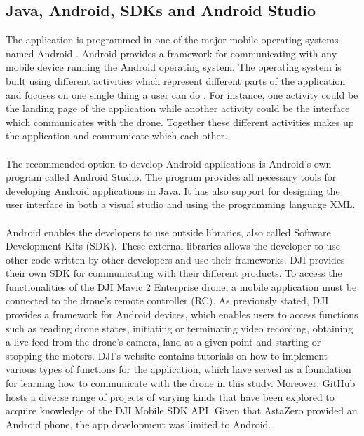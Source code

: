 \subsection{Java, Android, SDKs and Android Studio} \label{Java, Android....}
The application is programmed in one of the major mobile operating systems named Android . Android provides a framework for communicating with any mobile device running the Android operating system. The operating system is built using different activities which represent different parts of the application  and focuses on one single thing a user can do \cite{Android}. For instance, one activity could be the landing page of the application while another activity could be the interface which communicates with the drone. Together these different activities makes up the application and communicate which each other.
\\ \\
The recommended option to develop Android applications is Android's own program called Android Studio. The program provides all necessary tools for developing Android applications in Java. It has also support for designing the user interface in both a visual studio and using the programming language XML.
\\ \\
Android enables the developers to use outside libraries, also called Software Development Kits (SDK). These external libraries allows the developer to use other code written by other developers and use their frameworks. DJI provides their own SDK for communicating with their different products.
\newline
To access the functionalities of the DJI Mavic 2 Enterprise drone, a mobile application must be connected to the drone's remote controller (RC). As previously stated, DJI provides a framework for Android devices, which enables users to access functions such as reading drone states, initiating or terminating video recording, obtaining a live feed from the drone's camera, land at a given point and starting or stopping the motors. DJI's website contains tutorials on how to implement various types of functions for the application, which have served as a foundation for learning how to communicate with the drone in this study. Moreover, GitHub hosts a diverse range of projects of varying kinds that have been explored to acquire knowledge of the DJI Mobile SDK API.
Given that AstaZero provided an Android phone, the app development was limited to Android.


